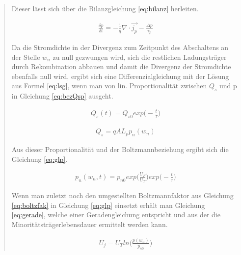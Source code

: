 \begin{quote}
	Dieser lässt sich über die Bilanzgleichung \ref{eq:bilanz} herleiten.
	
	\begin{equation}
         \begin{split}
             \frac{\delta p}{\delta t}=-\frac{1}{q}\nabla \cdot \vec{j_{p}}-\frac{\Delta p}{\tau_{p}}
         \end{split}
         \label{eq:bilanz}
    \end{equation}
    
    Da die Stromdichte in der Divergenz zum Zeitpunkt des Abschaltens an der 
    Stelle $w_{n}$ zu null gezwungen wird, sich die restlichen Ladungsträger 
    durch Rekombination abbauen und damit die Divergenz der Stromdichte 
    ebenfalls null wird, ergibt sich eine Differenzialgleichung mit der Lösung 
    aus Formel \ref{eq:lsg}, wenn man von lin. Proportionalität zwischen $Q_{s}$ 
    und p in Gleichung \ref{eq:bezQsp} ausgeht.
    
    \begin{equation}
         \begin{split}
             Q_{s}(t)=Q_{s0}exp\Big(-\frac{t}{\tau}\Big)
         \end{split}
         \label{eq:lsg}
    \end{equation}
    
    \begin{equation}
         \begin{split}
             Q_{s}=qAL_{p}p_{n}(w_{n})
         \end{split}
         \label{eq:bezQsp}
    \end{equation}
	
	Aus dieser Proportionalität und der Boltzmannbeziehung ergibt sich die 
	Gleichung \ref{eq:glp}.
	
	\begin{equation}
         \begin{split}
             p_{n}(w_{n},t)=p_{n0}exp\Big(\frac{U_{F}}{U_{T}}\Big)exp\Big(-\frac{t}{\tau}\Big)
         \end{split}
         \label{eq:glp}
    \end{equation}
	
	Wenn man zuletzt noch den umgestellten Boltzmannfaktor aus Gleichung
	\ref{eq:boltzfak} in Gleichung \ref{eq:glp} einsetzt erhält man Gleichung
	\ref{eq:gerade}, welche einer Geradengleichung entspricht und aus der die 
	Minoritätsträgerlebensdauer ermittelt werden kann.
	
	\begin{equation}
         \begin{split}
             U_{j}=U_{T}ln\Big(\frac{p(w_{n})}{p_{n0}}\Big)
         \end{split}
         \label{eq:boltzfak}
    \end{equation}
	

\end{quote}
